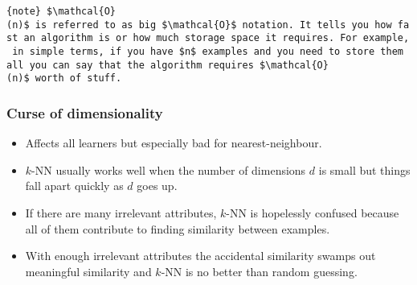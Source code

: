 \documentclass[11pt]{article}
\providecommand{\tightlist}{%
      \setlength{\itemsep}{0pt}\setlength{\parskip}{0pt}}
\begin{document}
    \texttt{\{note\}\ \$\textbackslash{}mathcal\{O\}(n)\$\ is\ referred\ to\ as\ big\ \$\textbackslash{}mathcal\{O\}\$\ notation.\ It\ tells\ you\ how\ fast\ an\ algorithm\ is\ or\ how\ much\ storage\ space\ it\ requires.\ For\ example,\ in\ simple\ terms,\ if\ you\ have\ \$n\$\ examples\ and\ you\ need\ to\ store\ them\ all\ you\ can\ say\ that\ the\ algorithm\ requires\ \$\textbackslash{}mathcal\{O\}(n)\$\ worth\ of\ stuff.}

    \subsubsection{Curse of dimensionality}\label{curse-of-dimensionality}

\begin{itemize}
\tightlist
\item
  Affects all learners but especially bad for nearest-neighbour.
\item
  \(k\)-NN usually works well when the number of dimensions \(d\) is
  small but things fall apart quickly as \(d\) goes up.
\item
  If there are many irrelevant attributes, \(k\)-NN is hopelessly
  confused because all of them contribute to finding similarity between
  examples.
\item
  With enough irrelevant attributes the accidental similarity swamps out
  meaningful similarity and \(k\)-NN is no better than random guessing.
\end{itemize}
\end{document}
